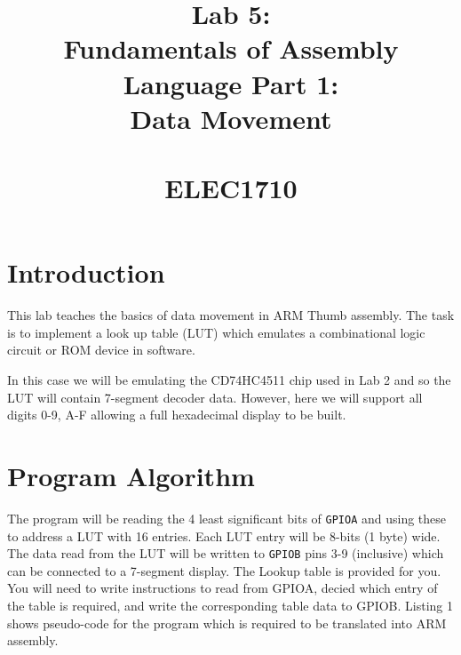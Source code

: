 \documentclass{UoNMCHA}
\numberwithin{equation}{section}
\begin{document}
\title{Lab 5:\\ Fundamentals of Assembly Language Part 1:\\ Data Movement \\ \ \\
{\small ELEC1710  \\ 
}}
\maketitle
\onecolumn

\vspace{-5mm}

\section{Introduction}

This lab teaches the basics of data movement in ARM Thumb assembly. The task is to implement a look up table (LUT) which emulates a combinational logic circuit or ROM device in software.

In this case we will be emulating the  CD74HC4511 chip used in Lab 2 and so the LUT will contain 7-segment decoder data. However, here we will support all digits 0-9, A-F allowing a full hexadecimal display to be built.

\section{Program Algorithm}\label{sec:algo}

The program will be reading the 4 least significant bits of \texttt{GPIOA} and using these to address a LUT with 16 entries. Each LUT entry will be 8-bits (1 byte) wide. The data read from the LUT will be written to \texttt{GPIOB} pins 3-9 (inclusive) which can be connected to a 7-segment display. The Lookup table is provided for you. You will need to write instructions to read from GPIOA, decied which entry of the table is required, and write the corresponding table data to GPIOB.  Listing 1 shows pseudo-code for the program which is required to be translated into ARM assembly.
\end{document}
